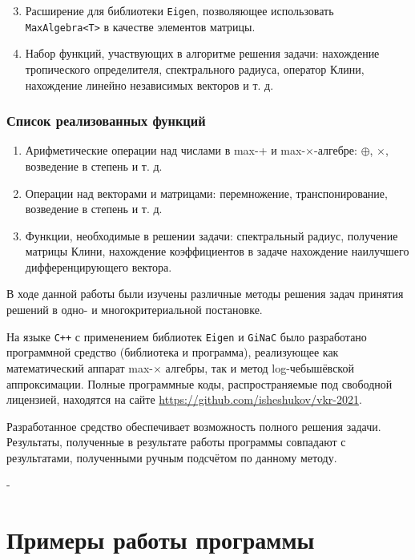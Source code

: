 \documentclass[specialist,
	substylefile = spbu.rtx,
	subf,href,colorlinks=true, 12pt]{disser}
\begin{document}
\begin{enumerate}
  \setcounter{enumi}{2}
		\item Расширение для библиотеки \texttt{Eigen}, позволяющее использовать \texttt{MaxAlgebra<T>} в качестве элементов матрицы.
		\item Набор функций, участвующих в алгоритме решения задачи: нахождение тропического определителя, спектрального радиуса, оператор Клини, нахождение линейно независимых векторов и т. д.
\end{enumerate}
\subsection{Список реализованных функций}

\begin{enumerate}
	\item Арифметические операции над числами в max-+ и max-$\times$-алгебре: $\oplus$, $\times$, возведение в степень и т. д.
	\item Операции над векторами и матрицами: перемножение, транспонирование, возведение в степень и т. д.
	\item Функции, необходимые в решении задачи: спектральный радиус, получение матрицы Клини, нахождение коэффициентов в задаче нахождение наилучшего дифференцирующего вектора.
\end{enumerate}

\conclusion
В ходе данной работы были изучены различные методы решения задач принятия решений в одно- и многокритериальной постановке.

На языке \texttt{C++} с применением библиотек \texttt{Eigen} и \texttt{GiNaC} было разработано программной средство (библиотека и программа), реализующее как математический аппарат max-$\times$ алгебры, так и метод log-чебышёвской аппроксимации. Полные программные коды, распространяемые под свободной лицензией, находятся на сайте \url{https://github.com/isheshukov/vkr-2021}.

Разработанное средство обеспечивает возможность полного решения задачи.
Результаты, полученные в результате работы программы совпадают с результатами, полученными ручным подсчётом по данному методу.

-
\printbibliography

\appendix
\cleardoublepage\makeatletter\@openrightfalse\makeatother
\chapter{Примеры работы программы}
\end{document}
